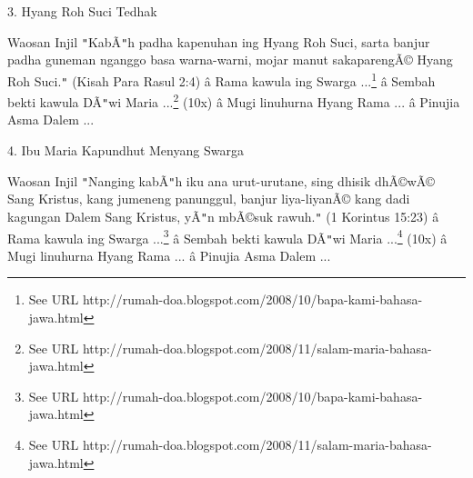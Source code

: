 
3. Hyang Roh Suci Tedhak

\newline


Waosan Injil
\texttt{{}"{}}Kab\~A\texttt{{}"{}}h padha kapenuhan ing Hyang Roh Suci, sarta banjur padha guneman nganggo basa warna-warni, mojar manut sakapareng\~A\copyright{} Hyang Roh Suci.\texttt{{}"{}} (Kisah Para Rasul 2:4)
\newline
 \^a\*  Rama kawula ing Swarga ...\footnote{See URL http://rumah-doa.blogspot.com/2008/10/bapa-kami-bahasa-jawa.html}\newline
 \^a\*  Sembah bekti kawula D\~A\texttt{{}"{}}wi Maria ...\footnote{See URL http://rumah-doa.blogspot.com/2008/11/salam-maria-bahasa-jawa.html} (10x)\newline
 \^a\*  Mugi linuhurna Hyang Rama ...\newline
 \^a\*  Pinujia Asma Dalem ...\newline


4. Ibu Maria Kapundhut Menyang Swarga

\newline


Waosan Injil
\texttt{{}"{}}Nanging kab\~A\texttt{{}"{}}h iku ana urut-urutane, sing dhisik dh\~A\copyright{}w\~A\copyright{} Sang Kristus, kang jumeneng panunggul, banjur liya-liyan\~A\copyright{} kang dadi kagungan Dalem Sang Kristus, y\~A\texttt{{}"{}}n mb\~A\copyright{}suk rawuh.\texttt{{}"{}} (1 Korintus 15:23)
\newline
 \^a\*  Rama kawula ing Swarga ...\footnote{See URL http://rumah-doa.blogspot.com/2008/10/bapa-kami-bahasa-jawa.html}\newline
 \^a\*  Sembah bekti kawula D\~A\texttt{{}"{}}wi Maria ...\footnote{See URL http://rumah-doa.blogspot.com/2008/11/salam-maria-bahasa-jawa.html} (10x)\newline
 \^a\*  Mugi linuhurna Hyang Rama ...\newline
 \^a\*  Pinujia Asma Dalem ...\newline

